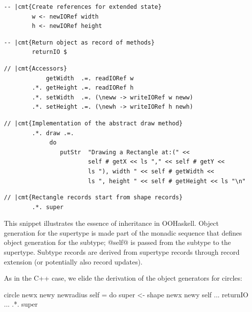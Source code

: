\documentclass{jfp}
\begin{document}
\begin{Verbatim}[fontsize=\small,commandchars=\|\{\}]
        -- |cmt{Create references for extended state}
        w <- newIORef width
        h <- newIORef height
\end{Verbatim}

\begin{Verbatim}[fontsize=\small,commandchars=\|\{\}]
	-- |cmt{Return object as record of methods}
        returnIO $
\end{Verbatim}


\begin{Verbatim}[fontsize=\small,commandchars=\|\{\}]
            // |cmt{Accessors}
            getWidth  .=. readIORef w
        .*. getHeight .=. readIORef h
        .*. setWidth  .=. (\neww -> writeIORef w neww)
        .*. setHeight .=. (\newh -> writeIORef h newh)
\end{Verbatim}

\begin{Verbatim}[fontsize=\small,commandchars=\|\{\}]
            // |cmt{Implementation of the abstract draw method}
        .*. draw .=. 
             do
                putStr  "Drawing a Rectangle at:(" <<
                        self # getX << ls "," << self # getY <<
                        ls "), width " << self # getWidth <<
                        ls ", height " << self # getHeight << ls "\n"
\end{Verbatim}

\begin{Verbatim}[fontsize=\small,commandchars=\|\{\}]
            // |cmt{Rectangle records start from shape records}
        .*. super
\end{Verbatim}

This snippet illustrates the essence of inheritance in OOHaskell.
Object generation for the supertype is made part of the monadic
sequence that defines object generation for the subtype; @self@ is
passed from the subtype to the supertype. Subtype records are derived
from supertype records through record extension (or potentially also
record updates).

As in the C++ case, we elide the derivation of the object generators
for circles:

\begin{code}
 circle newx newy newradius self
  = do
       super <- shape newx newy self
       ...
       returnIO ... .*. super
\end{code}
\end{document}
